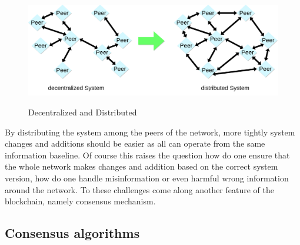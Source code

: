 \documentclass[paper=a4, fontsize=11pt]{scrartcl} %
\numberwithin{equation}{section} %
\numberwithin{figure}{section} %
\numberwithin{table}{section} %
\begin{document}
\begin{figure}[H]
  \caption{Decentralized and Distributed}
  \centering
    \includegraphics[width=1\textwidth]{centri.png}
  \label{fig:decen}  
\end{figure}
 
By distributing the system among the peers of the network, more tightly system changes and additions should be easier as all can operate from the same information baseline. Of course this raises the question how do one ensure that the whole network makes changes and addition based on the correct system version, how do one handle misinformation or even harmful wrong information around the network. To these challenges come along another feature of the blockchain, namely consensus mechanism. 

\subsection{Consensus algorithms}
\end{document}
